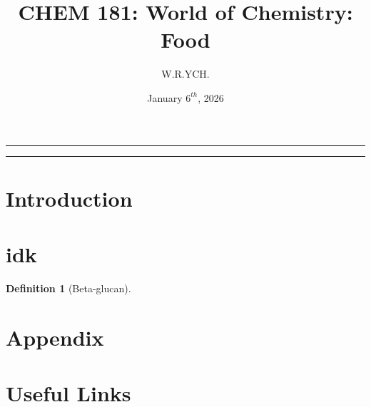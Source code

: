 \documentclass{article}
\newtheorem{definition}{Definition}
\begin{document}
\title{CHEM 181: World of Chemistry: Food}
\author{W.R.YCH.}
\date{January \(6^{th}\), 2026}
\setcounter{Maxaffil}{0}
\renewcommand\Affilfont{\itshape\small}
\maketitle

\noindent\rule{\textwidth}{0.4pt}
\thispagestyle{empty}
\begin{abstract}
\end{abstract}
\noindent\rule{\textwidth}{0.4pt}
\clearpage

\thispagestyle{empty}
\hypersetup{
    citecolor=black,
    filecolor=black,
    linkcolor=black,
    urlcolor=black
}
\tableofcontents
\clearpage

\setcounter{page}{1}
\section{Introduction}

\section{idk}
\begin{definition}[Beta-glucan]

\end{definition}


\section{Appendix}

\section{Useful Links}
\end{document}
